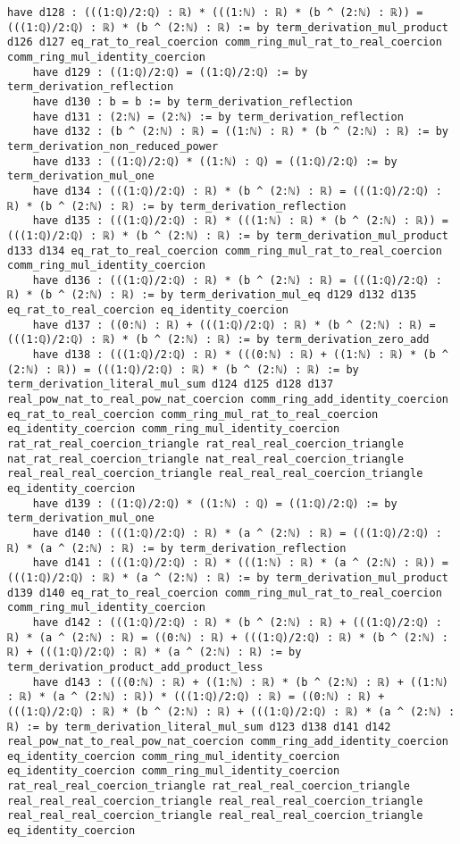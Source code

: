 \documentclass{article}
\begin{document}
\begin{tcolorbox}[colback=white!10, width=\linewidth]
\begin{lstlisting}[language=Lean4]
    have d128 : (((1:ℚ)/2:ℚ) : ℝ) * (((1:ℕ) : ℝ) * (b ^ (2:ℕ) : ℝ)) = (((1:ℚ)/2:ℚ) : ℝ) * (b ^ (2:ℕ) : ℝ) := by term_derivation_mul_product d126 d127 eq_rat_to_real_coercion comm_ring_mul_rat_to_real_coercion comm_ring_mul_identity_coercion
    have d129 : ((1:ℚ)/2:ℚ) = ((1:ℚ)/2:ℚ) := by term_derivation_reflection
    have d130 : b = b := by term_derivation_reflection
    have d131 : (2:ℕ) = (2:ℕ) := by term_derivation_reflection
    have d132 : (b ^ (2:ℕ) : ℝ) = ((1:ℕ) : ℝ) * (b ^ (2:ℕ) : ℝ) := by term_derivation_non_reduced_power
    have d133 : ((1:ℚ)/2:ℚ) * ((1:ℕ) : ℚ) = ((1:ℚ)/2:ℚ) := by term_derivation_mul_one
    have d134 : (((1:ℚ)/2:ℚ) : ℝ) * (b ^ (2:ℕ) : ℝ) = (((1:ℚ)/2:ℚ) : ℝ) * (b ^ (2:ℕ) : ℝ) := by term_derivation_reflection
    have d135 : (((1:ℚ)/2:ℚ) : ℝ) * (((1:ℕ) : ℝ) * (b ^ (2:ℕ) : ℝ)) = (((1:ℚ)/2:ℚ) : ℝ) * (b ^ (2:ℕ) : ℝ) := by term_derivation_mul_product d133 d134 eq_rat_to_real_coercion comm_ring_mul_rat_to_real_coercion comm_ring_mul_identity_coercion
    have d136 : (((1:ℚ)/2:ℚ) : ℝ) * (b ^ (2:ℕ) : ℝ) = (((1:ℚ)/2:ℚ) : ℝ) * (b ^ (2:ℕ) : ℝ) := by term_derivation_mul_eq d129 d132 d135 eq_rat_to_real_coercion eq_identity_coercion
    have d137 : ((0:ℕ) : ℝ) + (((1:ℚ)/2:ℚ) : ℝ) * (b ^ (2:ℕ) : ℝ) = (((1:ℚ)/2:ℚ) : ℝ) * (b ^ (2:ℕ) : ℝ) := by term_derivation_zero_add
    have d138 : (((1:ℚ)/2:ℚ) : ℝ) * (((0:ℕ) : ℝ) + ((1:ℕ) : ℝ) * (b ^ (2:ℕ) : ℝ)) = (((1:ℚ)/2:ℚ) : ℝ) * (b ^ (2:ℕ) : ℝ) := by term_derivation_literal_mul_sum d124 d125 d128 d137 real_pow_nat_to_real_pow_nat_coercion comm_ring_add_identity_coercion eq_rat_to_real_coercion comm_ring_mul_rat_to_real_coercion eq_identity_coercion comm_ring_mul_identity_coercion rat_rat_real_coercion_triangle rat_real_real_coercion_triangle nat_rat_real_coercion_triangle nat_real_real_coercion_triangle real_real_real_coercion_triangle real_real_real_coercion_triangle eq_identity_coercion
    have d139 : ((1:ℚ)/2:ℚ) * ((1:ℕ) : ℚ) = ((1:ℚ)/2:ℚ) := by term_derivation_mul_one
    have d140 : (((1:ℚ)/2:ℚ) : ℝ) * (a ^ (2:ℕ) : ℝ) = (((1:ℚ)/2:ℚ) : ℝ) * (a ^ (2:ℕ) : ℝ) := by term_derivation_reflection
    have d141 : (((1:ℚ)/2:ℚ) : ℝ) * (((1:ℕ) : ℝ) * (a ^ (2:ℕ) : ℝ)) = (((1:ℚ)/2:ℚ) : ℝ) * (a ^ (2:ℕ) : ℝ) := by term_derivation_mul_product d139 d140 eq_rat_to_real_coercion comm_ring_mul_rat_to_real_coercion comm_ring_mul_identity_coercion
    have d142 : (((1:ℚ)/2:ℚ) : ℝ) * (b ^ (2:ℕ) : ℝ) + (((1:ℚ)/2:ℚ) : ℝ) * (a ^ (2:ℕ) : ℝ) = ((0:ℕ) : ℝ) + (((1:ℚ)/2:ℚ) : ℝ) * (b ^ (2:ℕ) : ℝ) + (((1:ℚ)/2:ℚ) : ℝ) * (a ^ (2:ℕ) : ℝ) := by term_derivation_product_add_product_less
    have d143 : (((0:ℕ) : ℝ) + ((1:ℕ) : ℝ) * (b ^ (2:ℕ) : ℝ) + ((1:ℕ) : ℝ) * (a ^ (2:ℕ) : ℝ)) * (((1:ℚ)/2:ℚ) : ℝ) = ((0:ℕ) : ℝ) + (((1:ℚ)/2:ℚ) : ℝ) * (b ^ (2:ℕ) : ℝ) + (((1:ℚ)/2:ℚ) : ℝ) * (a ^ (2:ℕ) : ℝ) := by term_derivation_literal_mul_sum d123 d138 d141 d142 real_pow_nat_to_real_pow_nat_coercion comm_ring_add_identity_coercion eq_identity_coercion comm_ring_mul_identity_coercion eq_identity_coercion comm_ring_mul_identity_coercion rat_real_real_coercion_triangle rat_real_real_coercion_triangle real_real_real_coercion_triangle real_real_real_coercion_triangle real_real_real_coercion_triangle real_real_real_coercion_triangle eq_identity_coercion

\end{lstlisting}
\end{tcolorbox}
\end{document}
